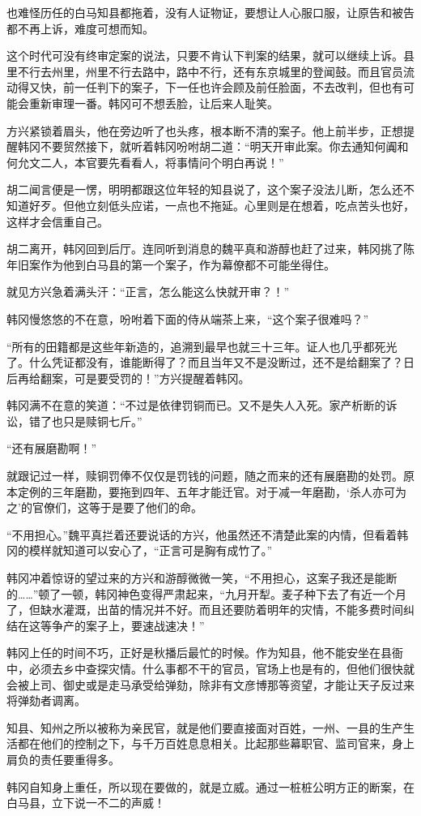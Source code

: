 也难怪历任的白马知县都拖着，没有人证物证，要想让人心服口服，让原告和被告都不再上诉，难度可想而知。

这个时代可没有终审定案的说法，只要不肯认下判案的结果，就可以继续上诉。县里不行去州里，州里不行去路中，路中不行，还有东京城里的登闻鼓。而且官员流动得又快，前一任判下的案子，下一任也许会顾及前任脸面，不去改判，但也有可能会重新审理一番。韩冈可不想丢脸，让后来人耻笑。

方兴紧锁着眉头，他在旁边听了也头疼，根本断不清的案子。他上前半步，正想提醒韩冈不要贸然接下，就听着韩冈吩咐胡二道：“明天开审此案。你去通知何阗和何允文二人，本官要先看看人，将事情问个明白再说！”

胡二闻言便是一愣，明明都跟这位年轻的知县说了，这个案子没法儿断，怎么还不知道好歹。但他立刻低头应诺，一点也不拖延。心里则是在想着，吃点苦头也好，这样才会信重自己。

胡二离开，韩冈回到后厅。连同听到消息的魏平真和游醇也赶了过来，韩冈挑了陈年旧案作为他到白马县的第一个案子，作为幕僚都不可能坐得住。

就见方兴急着满头汗：“正言，怎么能这么快就开审？！”

韩冈慢悠悠的不在意，吩咐着下面的侍从端茶上来，“这个案子很难吗？”

“所有的田籍都是这些年新造的，追溯到最早也就三十三年。证人也几乎都死光了。什么凭证都没有，谁能断得了？而且当年又不是没断过，还不是给翻案了？日后再给翻案，可是要受罚的！”方兴提醒着韩冈。

韩冈满不在意的笑道：“不过是依律罚铜而已。又不是失人入死。家产析断的诉讼，错了也只是赎铜七斤。”

“还有展磨勘啊！”

就跟记过一样，赎铜罚俸不仅仅是罚钱的问题，随之而来的还有展磨勘的处罚。原本定例的三年磨勘，要拖到四年、五年才能迁官。对于减一年磨勘，‘杀人亦可为之’的官僚们，这等于是要了他们的命。

“不用担心。”魏平真拦着还要说话的方兴，他虽然还不清楚此案的内情，但看着韩冈的模样就知道可以安心了，“正言可是胸有成竹了。”

韩冈冲着惊讶的望过来的方兴和游醇微微一笑，“不用担心，这案子我还是能断的……”顿了一顿，韩冈神色变得严肃起来，“九月开犁。麦子种下去了有近一个月了，但缺水灌溉，出苗的情况并不好。而且还要防着明年的灾情，不能多费时间纠结在这等争产的案子上，要速战速决！”

韩冈上任的时间不巧，正好是秋播后最忙的时候。作为知县，他不能安坐在县衙中，必须去乡中查探灾情。什么事都不干的官员，官场上也是有的，但他们很快就会被上司、御史或是走马承受给弹劾，除非有文彦博那等资望，才能让天子反过来将弹劾者调离。

知县、知州之所以被称为亲民官，就是他们要直接面对百姓，一州、一县的生产生活都在他们的控制之下，与千万百姓息息相关。比起那些幕职官、监司官来，身上肩负的责任要重得多。

韩冈自知身上重任，所以现在要做的，就是立威。通过一桩桩公明方正的断案，在白马县，立下说一不二的声威！

